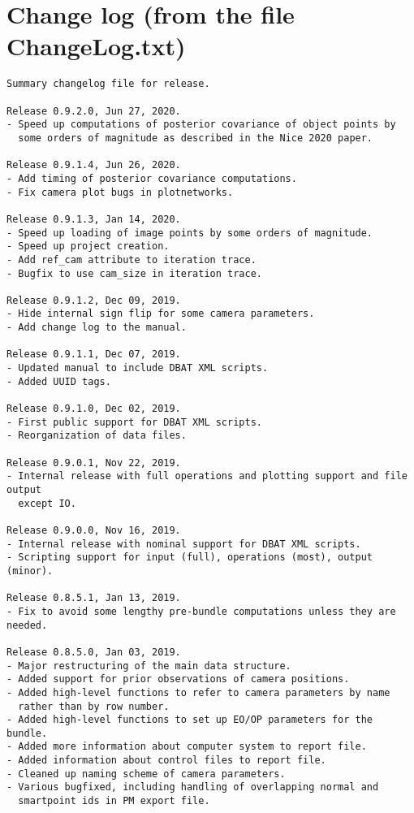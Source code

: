 \documentclass{article}
\begin{document}
\section[Change log]{Change log (from the file ChangeLog.txt)}
\label{sec:changeLog}
\begin{verbatim}
Summary changelog file for release.

Release 0.9.2.0, Jun 27, 2020.
- Speed up computations of posterior covariance of object points by
  some orders of magnitude as described in the Nice 2020 paper.

Release 0.9.1.4, Jun 26, 2020.
- Add timing of posterior covariance computations.
- Fix camera plot bugs in plotnetworks.

Release 0.9.1.3, Jan 14, 2020.
- Speed up loading of image points by some orders of magnitude.
- Speed up project creation.
- Add ref_cam attribute to iteration trace.
- Bugfix to use cam_size in iteration trace.

Release 0.9.1.2, Dec 09, 2019.
- Hide internal sign flip for some camera parameters.
- Add change log to the manual.

Release 0.9.1.1, Dec 07, 2019.
- Updated manual to include DBAT XML scripts.
- Added UUID tags.

Release 0.9.1.0, Dec 02, 2019.
- First public support for DBAT XML scripts.
- Reorganization of data files.

Release 0.9.0.1, Nov 22, 2019.
- Internal release with full operations and plotting support and file output
  except IO.

Release 0.9.0.0, Nov 16, 2019.
- Internal release with nominal support for DBAT XML scripts.
- Scripting support for input (full), operations (most), output (minor).

Release 0.8.5.1, Jan 13, 2019.
- Fix to avoid some lengthy pre-bundle computations unless they are needed.

Release 0.8.5.0, Jan 03, 2019.
- Major restructuring of the main data structure.
- Added support for prior observations of camera positions.
- Added high-level functions to refer to camera parameters by name
  rather than by row number.
- Added high-level functions to set up EO/OP parameters for the bundle.
- Added more information about computer system to report file.
- Added information about control files to report file.
- Cleaned up naming scheme of camera parameters.
- Various bugfixed, including handling of overlapping normal and
  smartpoint ids in PM export file.


\end{verbatim}
\end{document}
